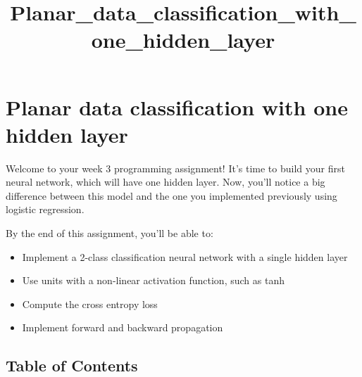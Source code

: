 \documentclass[11pt]{article}
\title{Planar\_data\_classification\_with\_one\_hidden\_layer}
\providecommand{\tightlist}{%
      \setlength{\itemsep}{0pt}\setlength{\parskip}{0pt}}
\begin{document}
    
    \maketitle
    
    

    
    \hypertarget{planar-data-classification-with-one-hidden-layer}{%
\section{Planar data classification with one hidden
layer}\label{planar-data-classification-with-one-hidden-layer}}

Welcome to your week 3 programming assignment! It's time to build your
first neural network, which will have one hidden layer. Now, you'll
notice a big difference between this model and the one you implemented
previously using logistic regression.

By the end of this assignment, you'll be able to:

\begin{itemize}
\tightlist
\item
  Implement a 2-class classification neural network with a single hidden
  layer
\item
  Use units with a non-linear activation function, such as tanh
\item
  Compute the cross entropy loss
\item
  Implement forward and backward propagation
\end{itemize}

    \hypertarget{table-of-contents}{%
\subsection{Table of Contents}\label{table-of-contents}}
\end{document}
